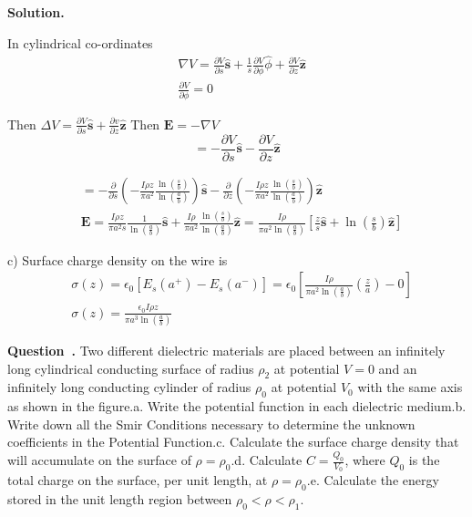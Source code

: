 \documentclass[12pt, a4paper, oneside]{report}
\newcounter{question}
\newenvironment{question}[1][]{\refstepcounter{question}\par\medskip
   \begin{mdframed}[backgroundcolor=gray!20]
   \noindent \textbf{Question~\thequestion. #1} \rmfamily}{\end{mdframed}\medskip}
\newenvironment{solution}{
  \par\medskip\noindent
  \textbf{Solution.}\quad\itshape
  \par\noindent\makebox[\linewidth]{\rule{\textwidth}{0.4pt}}
}{
  \par\noindent\makebox[\linewidth]{\rule{\textwidth}{0.4pt}}
  \par\medskip
}
\begin{document}
\begin{solution}
In cylindrical co-ordinates
$$
\begin{aligned}
& \nabla V=\frac{\partial V}{\partial s} \hat{\mathbf{s}}+\frac{1}{s} \frac{\partial V}{\partial \phi} \hat{\phi}+\frac{\partial V}{\partial z} \hat{\mathbf{z}} \\
& \frac{\partial V}{\partial \phi}=0
\end{aligned}
$$

Then $\Delta V=\frac{\partial V}{\partial s} \hat{\mathbf{s}}+\frac{\partial v}{\partial z} \hat{\mathbf{z}}$
Then $\mathbf{E}=-\nabla V$
$$
=-\frac{\partial V}{\partial s} \hat{\mathbf{s}}-\frac{\partial V}{\partial z} \hat{\mathbf{z}}
$$

$$
\begin{aligned}
& =-\frac{\partial}{\partial s}\left(-\frac{I \rho z}{\pi a^2} \frac{\ln \left(\frac{s}{b}\right)}{\ln \left(\frac{a}{b}\right)}\right) \hat{\mathbf{s}}-\frac{\partial}{\partial z}\left(-\frac{I \rho z}{\pi a^2} \frac{\ln \left(\frac{s}{b}\right)}{\ln \left(\frac{a}{b}\right)}\right) \hat{\mathbf{z}} \\
& \mathbf{E}=\frac{I \rho z}{\pi a^2 s} \frac{1}{\ln \left(\frac{a}{b}\right)} \hat{\mathbf{s}}+\frac{I \rho}{\pi a^2} \frac{\ln \left(\frac{s}{b}\right)}{\ln \left(\frac{a}{b}\right)} \hat{\mathbf{z}}  =\frac{I \rho}{\pi a^2 \ln \left(\frac{a}{b}\right)}\left[\frac{z}{s} \hat{\mathbf{s}}+\ln \left(\frac{s}{b}\right) \hat{\mathbf{z}}\right]
\end{aligned}
$$

c) Surface charge density on the wire is
$$
\begin{aligned}
& \sigma(z)=\epsilon_0\left[E_s\left(a^{+}\right)-E_s\left(a^{-}\right)\right] =\epsilon_0\left[\frac{I \rho}{\pi a^2 \ln \left(\frac{a}{b}\right)}\left(\frac{z}{a}\right)-0\right] \\
& \sigma(z)=\frac{\epsilon_0 I \rho z}{\pi a^3 \ln \left(\frac{a}{b}\right)}
\end{aligned}
$$
\end{solution}

\newpage
\begin{question}
Two different dielectric materials are placed between an infinitely long cylindrical conducting surface of radius $\rho_2$ at potential $V=0$ and an infinitely long conducting cylinder of radius $\rho_0$ at potential $V_0$ with the same axis as shown in the figure.a. Write the potential function in each dielectric medium.b. Write down all the Smir Conditions necessary to determine the unknown coefficients in the Potential Function.c. Calculate the surface charge density that will accumulate on the surface of $\rho=\rho_0$.d. Calculate $C=\frac{Q_0}{V_0}$, where $Q_0$ is the total charge on the surface, per unit length, at $\rho=\rho_0$.e. Calculate the energy stored in the unit length region between $\rho_0<\rho<\rho_1$.
\end{question}
\end{document}
